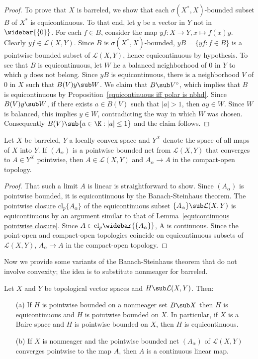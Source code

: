 \begin{proof}
To prove that $X$ is barreled, we show that each $\sigma(X^*,X)$-bounded subset $B$ of $X^*$ is equicontinuous. To that end, let $y$ be a vector in $Y$ not in $\widebar{\{0\}}$. For each $f\in B$, consider the map $yf:X\to Y,x\mapsto f(x)y$. Clearly $yf\in\mathcal{L}(X,Y)$. Since $B$ is $\sigma(X^*,X)$-bounded, $yB=\{yf:f\in B\}$ is a pointwise bounded subset of $\mathcal{L}(X,Y)$, hence equicontinuous by hypothesis. To see that $B$ is equicontinuous, let $W$ he a balanced neighborhood of $0$ in $Y$ to which $y$ does not belong. Since $yB$ is equicontinuous, there is a neighborhood $V$ of $0$ in $X$ such that $B(V)y\sub W$. We claim that $B\sub V^\circ$, which implies that $B$ is equicontinuous by Proposition~\ref{equicontinuous iff polar is nbhd}. Since $B(V)y\sub W$, if there exists $a\in B(V)$ such that $|a|>1$, then $ay\in W$. Since $W$ is balanced, this implies $y\in W$, contradicting the way in which $W$ was chosen. Consequently $B(V)\sub\{a\in\K:|a|\leq 1\}$ and the claim follows.
\end{proof}
\begin{proposition}
Let $X$ be barreled, $Y$ a locally convex space and $Y^X$ denote the space of all maps of $X$ into $Y$. If $(A_\alpha)$ is a pointwise bounded net from $\mathcal{L}(X,Y)$ that converges to $A\in Y^X$ pointwise, then $A\in\mathcal{L}(X,Y)$ and $A_\alpha\to A$ in the compact-open topology.
\end{proposition}
\begin{proof}
That such a limit $A$ is linear is straightforward to show. Since $(A_\alpha)$ is pointwise bounded, it is equicontinuous by the Banach-Steinhaus theorem. The pointwise closure $\mathrm{cl}_p\{A_\alpha\}$ of the equicontinuous subset $\{A_\alpha\}\sub\mathcal{L}(X,Y)$ is equicontinuous by an argument similar to that of Lemma~\ref{equicontinuous pointwise closure}. Since $A\in\mathrm{cl}_p\widebar{\{A_\alpha\}}$, A is continuous. Since the point-open and compact-open topologies coincide on equicontinuous subsets of $\mathcal{L}(X,Y)$, $A_\alpha\to A$ in the compact-open topology.
\end{proof}
Now we provide some variants of the Banach-Steinhaus theorem that do not involve convexity; the idea is to substitute nonmeager for barreled.
\begin{theorem}\label{Banach-Steinhaus without convexity}
Let $X$ and $Y$ be topological vector spaces and $H\sub\mathcal{L}(X,Y)$. Then:
\begin{itemize}
\item[(a)] If $H$ is pointwise bounded on a nonmeager set $B\sub X$ then $H$ is equicontinuous and $H$ is poiutwise bounded on $X$. In particular, if $X$ is a Baire space and $H$ is pointwise bounded on $X$, then $H$ is equicontinuous.
\item[(b)] If $X$ is nonmeager and the pointwise bounded net $(A_\alpha)$ of $\mathcal{L}(X,Y)$ converges pointwise to the map $A$, then $A$ is a continuous linear map.
\end{itemize}
\end{theorem}

